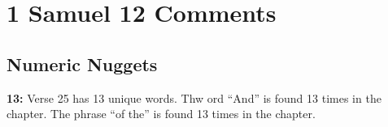 \section{1 Samuel 12 Comments}

\subsection{Numeric Nuggets}
\textbf{13: } Verse 25 has 13 unique words. Thw ord ``And'' is found 13 times in the chapter. The phrase ``of the'' is found 13 times in the chapter.